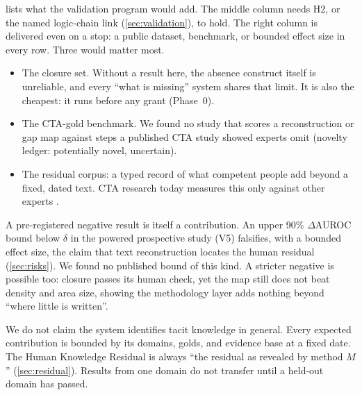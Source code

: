 \evfut{}  lists what the validation program would add. The middle column
needs H2, or the named logic-chain link (\cref{sec:validation}), to hold. The right column is
delivered even on a stop: a public dataset, benchmark, or bounded effect size in every row. Three
would matter most.
\begin{itemize}[nosep]
  \item The closure set. Without a result here, the absence construct itself is unreliable, and every
    \enquote{what is missing} system shares that limit. It is also the cheapest: it runs before any
    grant (Phase~0).
  \item The CTA-gold benchmark. We found no study that scores a reconstruction or gap map against
    steps a published CTA study showed experts omit (novelty ledger: potentially novel, uncertain).
  \item The residual corpus: a typed record of what competent people add beyond a fixed, dated text.
    CTA research today measures this only against other experts
    \parencite{sullivan2014use,chao1994percentage}.
\end{itemize}

\evint{} A pre-registered negative result is itself a contribution. An upper 90\% $\Delta$AUROC
bound below $\delta$ in the powered prospective study (V5) falsifies, with a bounded effect size, the
claim that text reconstruction locates the human residual (\cref{sec:risks}). We found no published
bound of this kind. A stricter negative is possible too: closure passes its human check, yet the map still
does not beat density and area size, showing the methodology layer adds nothing beyond
\enquote{where little is written}.

We do not claim the system identifies tacit knowledge in general. Every expected contribution is
bounded by its domains, golds, and evidence base at a fixed date. The Human Knowledge Residual is
always \enquote{the residual as revealed by method $M$} (\cref{sec:residual}). Results from one
domain do not transfer until a held-out domain has passed.
